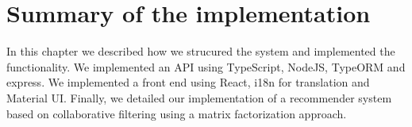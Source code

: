 \section{Summary of the implementation}
In this chapter we described how we strucured the system and implemented the functionality.
We implemented an API using TypeScript, NodeJS, TypeORM and express.
We implemented a front end using React, i18n for translation and Material UI.
Finally, we detailed our implementation of a recommender system based on collaborative filtering using a matrix factorization approach.
